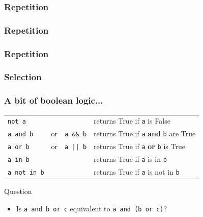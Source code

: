 \documentclass[xcolor=dvipsnames]{beamer}
\begin{document}
\begin{frame}
\frametitle{Repetition}

\end{frame}

\begin{frame}
\frametitle{Repetition}

\end{frame}

\begin{frame}
\frametitle{Repetition}

\end{frame}

\begin{frame}
\frametitle{Selection}

\end{frame}

\begin{frame}
\frametitle{A bit of boolean logic...}
\begin{table}
\begin{tabular}{lcl| l}
\texttt{not a} & & & returns True if \texttt{a} is False \\
\texttt{a and b} & {\tiny or} & \texttt{a \&\& b} & returns True if \texttt{a} \textbf{and} \texttt{b} are True \\
\texttt{a or b} & {\tiny or} & \texttt{a || b} & returns True if \texttt{a} \textbf{or} \texttt{b} is True \\
\hline
\texttt{a in b} & & & returns True if \texttt{a} is in \texttt{b} \\
\texttt{a not in b} & & & returns True if \texttt{a} is not in \texttt{b} \\
\end{tabular}
\end{table}

\begin{alertblock}{Question}
\begin{itemize}
\item Is \texttt{a and b or c} equivalent to \texttt{a and (b or c)}?
\end{itemize}
\end{alertblock}
\end{frame}
\end{document}
